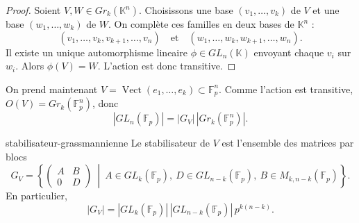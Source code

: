 \begin{proof}
    Soient $V,W\in Gr_k(\mathbb{K}^n)$. Choisissons une base
    $(v_1,\dots,v_k)$ de $V$ et une base $(w_1,\dots,w_k)$ de $W$. On complète
    ces familles en deux bases de $\mathbb{K}^n$ :
    \[
        (v_1,\dots,v_k,v_{k+1},\dots,v_n)
        \quad\text{et}\quad
        (w_1,\dots,w_k,w_{k+1},\dots,w_n).
    \]
    Il existe un unique automorphisme lineaire $\phi\in GL_n(\mathbb{K})$
    envoyant chaque $v_i$ sur $w_i$. Alors $\phi(V)=W$. L'action est donc
    transitive.
\end{proof}

On prend maintenant $V=\operatorname{Vect}(e_1,\dots,e_k)\subset\mathbb{F}_p^n$.
Comme l'action est transitive, $O(V)=Gr_k(\mathbb{F}_p^n)$, donc
\[
    |GL_n(\mathbb{F}_p)|=|G_V|\,|Gr_k(\mathbb{F}_p^n)|.
\]

\begin{proposition}{}{stabilisateur-grassmannienne}
    Le stabilisateur de $V$ est l'ensemble des matrices par blocs
    \[
        G_V=
        \left\{
        \begin{pmatrix}
            A & B \\
            0 & D
        \end{pmatrix}
        \ \middle|\
        A\in GL_k(\mathbb{F}_p),\
        D\in GL_{n-k}(\mathbb{F}_p),\
        B\in M_{k,n-k}(\mathbb{F}_p)
        \right\}.
    \]
    En particulier,
    \[
        |G_V|=|GL_k(\mathbb{F}_p)|\,|GL_{n-k}(\mathbb{F}_p)|\,p^{k(n-k)}.
    \]
\end{proposition}

